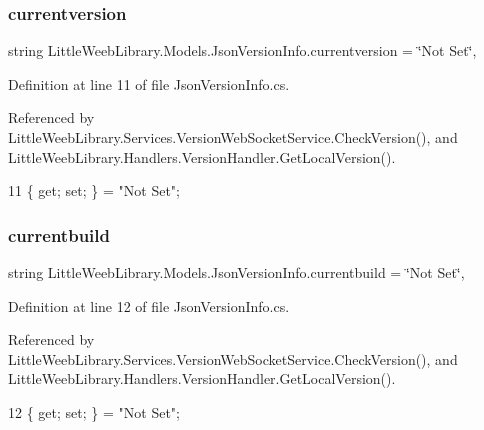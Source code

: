 \subsubsection{\texorpdfstring{currentversion}{currentversion}}
{\footnotesize\ttfamily string Little\+Weeb\+Library.\+Models.\+Json\+Version\+Info.\+currentversion = \char`\"{}Not Set\char`\"{}\hspace{0.3cm}{\ttfamily [get]}, {\ttfamily [set]}}



Definition at line 11 of file Json\+Version\+Info.\+cs.



Referenced by Little\+Weeb\+Library.\+Services.\+Version\+Web\+Socket\+Service.\+Check\+Version(), and Little\+Weeb\+Library.\+Handlers.\+Version\+Handler.\+Get\+Local\+Version().


\begin{DoxyCode}
11 \{ \textcolor{keyword}{get}; \textcolor{keyword}{set}; \} = \textcolor{stringliteral}{"Not Set"};
\end{DoxyCode}
\mbox{\label{class_little_weeb_library_1_1_models_1_1_json_version_info_adb75e140a3dcc76b8ca6c1dd3c0f060a}} 
\subsubsection{\texorpdfstring{currentbuild}{currentbuild}}
{\footnotesize\ttfamily string Little\+Weeb\+Library.\+Models.\+Json\+Version\+Info.\+currentbuild = \char`\"{}Not Set\char`\"{}\hspace{0.3cm}{\ttfamily [get]}, {\ttfamily [set]}}



Definition at line 12 of file Json\+Version\+Info.\+cs.



Referenced by Little\+Weeb\+Library.\+Services.\+Version\+Web\+Socket\+Service.\+Check\+Version(), and Little\+Weeb\+Library.\+Handlers.\+Version\+Handler.\+Get\+Local\+Version().


\begin{DoxyCode}
12 \{ \textcolor{keyword}{get}; \textcolor{keyword}{set}; \} = \textcolor{stringliteral}{"Not Set"};
\end{DoxyCode}
\mbox{\label{class_little_weeb_library_1_1_models_1_1_json_version_info_a08d3b36c375a460b440678f84bdb64ee}} 
